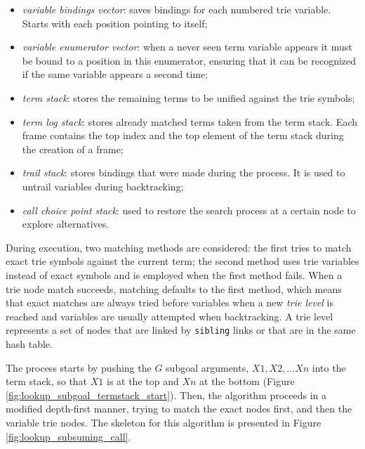 \begin{itemize}
  \item \textit{variable bindings vector}: saves bindings for each numbered trie variable. Starts with each position pointing to itself;
  \item \textit{variable enumerator vector}: when a never seen term variable appears it must be bound to a position in this enumerator, ensuring that it can be recognized if the same variable appears a second time;
  \item \textit{term stack}: stores the remaining terms to be unified against the trie symbols;
  \item \textit{term log stack}: stores already matched terms taken from the term stack. Each frame contains the top index and the top element of the term stack during the creation of a frame;
  \item \textit{trail stack}: stores bindings that were made during the process. It is used to untrail variables during backtracking;
  \item \textit{call choice point stack}: used to restore the search process at a certain node to explore alternatives.
\end{itemize}

During execution, two matching methods are considered: the first tries to match exact trie symbols against the current term;
the second method uses trie variables instead of exact symbols and is employed when the first method fails.
When a trie node match succeeds, matching defaults to the first method, which means
that exact matches are always tried before variables when a new \textit{trie level} is reached and variables are usually attempted
when backtracking. A trie level represents a set of nodes that are linked by \texttt{sibling} links or that are
in the same hash table.

The process starts by pushing the $G$ subgoal arguments, $X1, X2, ...Xn$ into the term stack, so that $X1$ is at the top
and $Xn$ at the bottom (Figure \ref{fig:lookup_subgoal_termstack_start}).
Then, the algorithm proceeds in a modified depth-first manner, trying to match the exact nodes first, and then
the variable trie nodes. The skeleton for this algorithm is presented in Figure \ref{fig:lookup_subsuming_call}.

